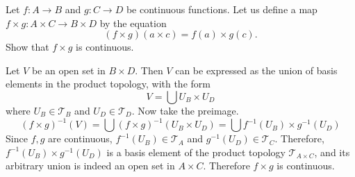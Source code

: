   \begin{exercise}[Munkres 18.10]
    Let $f : A \to B$ and $g : C \to D$ be continuous functions. Let us define a map $f \times g : A \times C \to B \times D$ by the equation
    \begin{equation}
      (f \times g)(a \times c) = f(a) \times g(c).
    \end{equation}
    Show that $f \times g$ is continuous.
  \end{exercise}
  \begin{solution}
    Let $V$ be an open set in $B \times D$. Then $V$ can be expressed as the union of basis elements in the product topology, with the form 
    \begin{equation}
      V = \bigcup U_B \times U_D
    \end{equation}
    where $U_B \in \mathscr{T}_B$ and $U_D \in \mathscr{T}_D$. Now take the preimage. 
    \begin{equation}
      (f \times g)^{-1} (V) = \bigcup (f \times g)^{-1} (U_B \times U_D) = \bigcup f^{-1}(U_B) \times g^{-1} (U_D)
    \end{equation}
    Since $f, g$ are continuous, $f^{-1} (U_B) \in \mathscr{T}_A$ and $g^{-1} (U_D) \in \mathscr{T}_C$. Therefore, $f^{-1} (U_B) \times g^{-1} (U_D)$ is a basis element of the product topology $\mathscr{T}_{A \times C}$, and its arbitrary union is indeed an open set in $A \times C$. Therefore $f \times g$ is continuous.  
  \end{solution}

